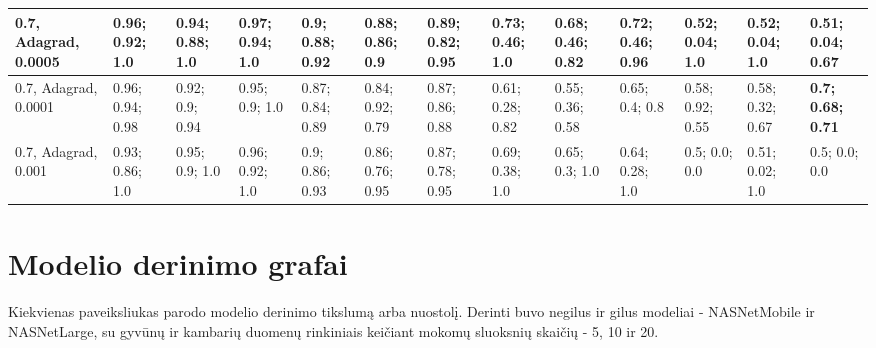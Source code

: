 \documentclass{VUMIFPSbakalaurinis}
\begin{document}
\begin{longtable}{ | p{1.5cm} | p{1cm} | p{1cm} | p{1cm} | p{1cm} | p{1cm} | p{1cm} | p{1cm} | p{1cm} | p{1cm} | p{1cm} | p{1cm} | p{1cm} | }
    0.7, Adagrad, 0.0005  & 0.96; 0.92; 1.0 & 0.94; 0.88; 1.0 & 0.97; 0.94; 1.0   &  \textbf{0.9; 0.88; 0.92} & 0.88; 0.86; 0.9 & 0.89; 0.82; 0.95    &  0.73; 0.46; 1.0 & 0.68; 0.46; 0.82 & \textbf{0.72; 0.46; 0.96}  & 0.52; 0.04; 1.0 & 0.52; 0.04; 1.0 & 0.51; 0.04; 0.67  \\ \hline
    0.7, Adagrad, 0.0001  & 0.96; 0.94; 0.98 & 0.92; 0.9; 0.94 & 0.95; 0.9; 1.0   &  0.87; 0.84; 0.89 & 0.84; 0.92; 0.79 & 0.87; 0.86; 0.88  &  0.61; 0.28; 0.82 & 0.55; 0.36; 0.58 & 0.65; 0.4; 0.8            &  0.58; 0.92; 0.55 & 0.58; 0.32; 0.67 &  \textbf{0.7; 0.68; 0.71}  \\ \hline
    0.7, Adagrad, 0.001   & 0.93; 0.86; 1.0 & 0.95; 0.9; 1.0 & 0.96; 0.92; 1.0    &  0.9; 0.86; 0.93 & 0.86; 0.76; 0.95 & 0.87; 0.78; 0.95   &  0.69; 0.38; 1.0 & 0.65; 0.3; 1.0 & 0.64; 0.28; 1.0              &  0.5; 0.0; 0.0 & 0.51; 0.02; 1.0 & 0.5; 0.0; 0.0  \\ \hline
\end{longtable}

\section{Modelio derinimo grafai}
Kiekvienas paveiksliukas parodo modelio derinimo tikslumą arba nuostolį. Derinti buvo negilus ir gilus modeliai - NASNetMobile ir NASNetLarge, su gyvūnų ir kambarių duomenų rinkiniais keičiant mokomų sluoksnių skaičių - 5, 10 ir 20.
\end{document}
